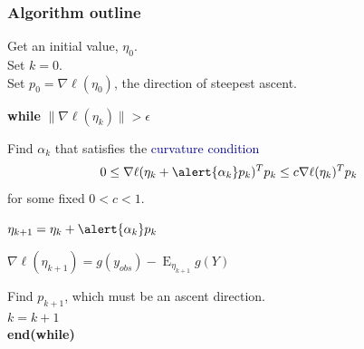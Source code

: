 \documentclass[ 10pt]{beamer}
\DeclareMathOperator{\E}{E}
\begin{document}
{
\frametitle{Algorithm outline}
\small

Get an initial value, $\eta_0$.\\ 
Set $k=0$. \\
Set $p_0 = \nabla \ell( \eta_0)$, the direction of steepest ascent. \\
\vspace*{2mm}

\textbf{while}  $\lVert \nabla \ell( \eta_k) \rVert > \epsilon$ \\ 
\vspace*{1mm}

\hspace*{4mm} Find \alert{$\alpha_k$} that satisfies the 
\textcolor{darkblue}{curvature condition}
\begin{align*}
	 0 & \leq \nabla \ell( \eta_k + \alert{\alpha_k} p_k)^T p_k \leq c \nabla \ell(\eta_k)^T p_k
\end{align*}
\hspace*{4mm} \indent for some fixed $0 < c < 1$.  
\vspace*{1mm}

\hspace*{4mm} $\eta_{k+1} = \eta_k + \alert{\alpha_k} p_k$\\
\vspace*{1mm}

\hspace*{4mm} $\nabla \ell( \eta_{k+1}) = g( y _{obs}) - \E_{\eta_{k+1}}g(Y)$\\
\vspace*{1mm}
 

\hspace*{4mm} \indent Find \alert{$p_{k+1}$}, which must be an ascent direction. \\


\hspace*{4mm} \indent $k = k + 1$  \\

\textbf{end(while)}
}


%
%
\end{document}
